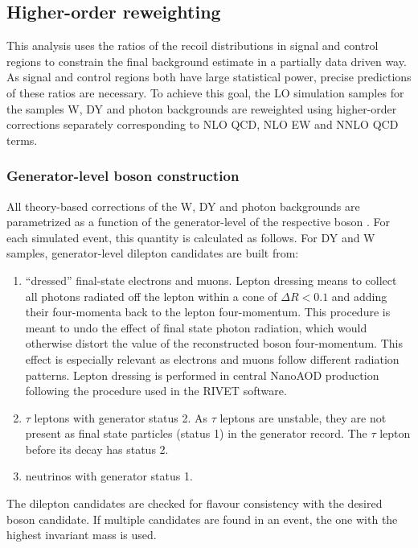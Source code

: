 \clearpage
\subsection{Higher-order reweighting}\label{sec:nlo}
This analysis uses the ratios of the recoil distributions in signal and control regions to constrain the final background estimate in a partially data driven way. As signal and control regions both have large statistical power, precise predictions of these ratios are necessary. To achieve this goal, the LO simulation samples for the samples W, DY and photon backgrounds are reweighted using higher-order corrections separately corresponding to NLO QCD, NLO EW and NNLO QCD terms.

\subsubsection{Generator-level boson construction}
All theory-based corrections of the W, DY and photon backgrounds are parametrized as a function of the generator-level \pt of the respective boson \ptv. For each simulated event, this quantity is calculated as follows. For DY and W samples, generator-level dilepton candidates are built from:

\begin{enumerate}
\item ``dressed'' final-state electrons and muons. Lepton dressing means to collect all photons radiated off the lepton within a cone of $\Delta R < 0.1$ and adding their four-momenta back to the lepton four-momentum. This procedure is meant to undo the effect of final state photon radiation, which would otherwise distort the value of the reconstructed boson four-momentum. This effect is especially relevant as electrons and muons follow different radiation patterns. Lepton dressing is performed in central NanoAOD production following the procedure used in the RIVET software.
\item $\tau$ leptons with generator status 2. As $\tau$ leptons are unstable, they are not present as final state particles (status 1) in the generator record. The $\tau$ lepton before its decay has status 2.
\item neutrinos with generator status 1.
\end{enumerate}

The dilepton candidates are checked for flavour consistency with the desired boson candidate. If multiple candidates are found in an event, the one with the highest invariant mass is used.

